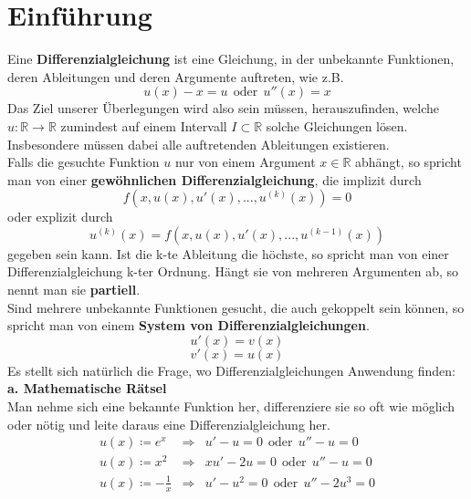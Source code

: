 \section{Einführung}
Eine \textbf{Differenzialgleichung} ist eine Gleichung, in der 
unbekannte Funktionen, deren Ableitungen und deren Argumente 
auftreten, wie z.B.
\begin{equation*}
	u(x)-x=u \ \ \mathrm{oder\ \ } u''(x) = x
\end{equation*}
Das Ziel unserer Überlegungen wird also sein müssen, 
herauszufinden, welche $u:\mathbb{R}\rightarrow\mathbb{R}$ 
zumindest auf einem Intervall $I\subset\mathbb{R}$ solche 
Gleichungen lösen. Insbesondere müssen dabei alle 
auftretenden Ableitungen existieren.\\
\linebreak
Falls die gesuchte Funktion $u$ nur von einem Argument 
$x\in\mathbb{R}$ abhängt, so spricht man von einer 
\textbf{gewöhnlichen Differenzialgleichung}, die 
implizit durch
\begin{equation*}
	f\left(x,u(x),u'(x),...,u^{(k)}(x)\right)=0
\end{equation*}
oder explizit durch
\begin{equation*}
	u^{(k)}(x)=f\left(x,u(x),u'(x),...,u^{(k-1)}(x)\right)
\end{equation*}
gegeben sein kann. Ist die k-te Ableitung die höchste, so spricht man von einer Differenzialgleichung k-ter Ordnung. 
Hängt sie von mehreren Argumenten ab, so nennt man sie 
\textbf{partiell}.\\
\linebreak
Sind mehrere unbekannte Funktionen gesucht, die auch 
gekoppelt sein können, so spricht man von einem \textbf{System 
von Differenzialgleichungen}. \newpage
\begin{equation*}
	u'(x)=v(x)
\end{equation*}
\begin{equation*}
	v'(x)=u(x)
\end{equation*}
\linebreak
Es stellt sich natürlich die Frage, wo Differenzialgleichungen 
Anwendung finden:\\
\linebreak
\textbf{a. Mathematische Rätsel}\\
\linebreak
Man nehme sich eine bekannte Funktion her, differenziere sie so
oft wie möglich oder nötig und leite daraus eine 
Differenzialgleichung her.
\begin{eqnarray*}
u(x)\coloneqq e^x & \Rightarrow & u'-u=0 \ \ \mathrm{oder\ \ } u''-u = 0 \\ 
u(x)\coloneqq x^2 & \Rightarrow & xu'-2u=0 \ \ \mathrm{oder\ \ } u''-u = 0 \\
u(x)\coloneqq -\frac{1}{x} & \Rightarrow & u'-u^2=0 \ \ \mathrm{oder\ \ } u''-2u^3 = 0 \\
\end{eqnarray*}
